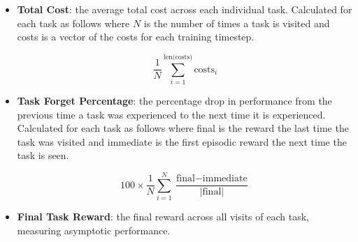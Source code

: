 \begin{itemize}
    \item \textbf{Total Cost}: the average total cost across each individual task. Calculated for each task as follows where $N$ is the number of times a task is visited and costs is a vector of the costs for each training timestep.

    \begin{equation}
        \frac{1}{N} \sum_{i=1}^{\text{len(costs)}} \text{costs}_i
    \end{equation}
    \item \textbf{Task Forget Percentage}: the percentage drop in performance from the previous time a task was experienced to the next time it is experienced. Calculated for each task as follows where final is the reward the last time the task was visited and immediate is the first episodic reward the next time the task is seen.

    \begin{equation}
        100 \times \frac{1}{N} \sum_{i=1}^{N} \frac{\text{final}-\text{immediate}}{|\text{final}|}
    \end{equation}
    
    \item \textbf{Final Task Reward}: the final reward across all visits of each task, measuring asymptotic performance.
\end{itemize}

